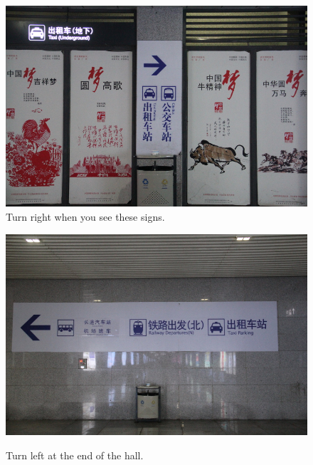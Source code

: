 \documentclass[11pt]{article}
\begin{document}
 \begin{figure}[!h]
	\begin{minipage}[t]{.5\textwidth}
     	\centering
        	\includegraphics[scale=0.27]{IMG_7194.jpg} \\
		\caption{Turn right when you see these signs.\label{7194}}
	\end{minipage}%
     \begin{minipage}[t]{.5\textwidth}
         \centering
       	 \includegraphics[scale=0.27]{IMG_7196.jpg} \\
	 	 \caption{Turn left at the end of the hall.\label{7194}}
    \end{minipage}%
 \end{figure}
\end{document}
